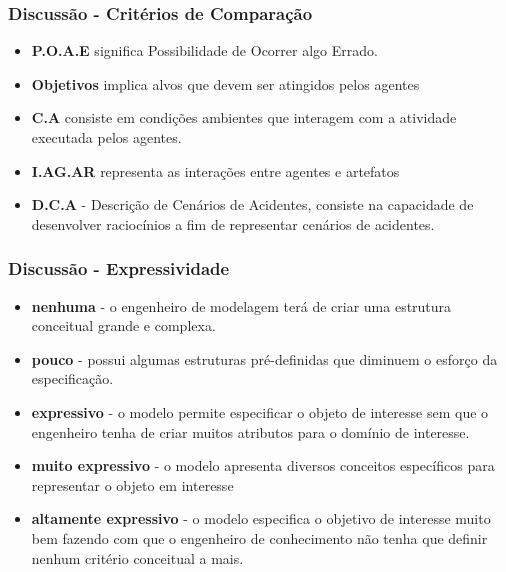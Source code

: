 \documentclass{beamer}
\begin{document}
\begin{frame}
	\frametitle{Discussão - Critérios de Comparação}
	\begin{itemize}
		\item \textbf{P.O.A.E} significa Possibilidade de Ocorrer algo Errado.
		\item \textbf{Objetivos} implica alvos que devem ser atingidos pelos agentes 
		\item \textbf{C.A} consiste em condições ambientes que interagem com a atividade executada pelos agentes.
		\item \textbf{I.AG.AR} representa as interações entre agentes e artefatos
		\item \textbf{D.C.A} - Descrição de Cenários de Acidentes, consiste na capacidade de desenvolver raciocínios a fim de representar cenários de acidentes.
	\end{itemize}
\end{frame}
\begin{frame}
	\frametitle{Discussão - Expressividade}
	\begin{itemize}
			\item \textbf{nenhuma} - o engenheiro de modelagem terá de criar uma estrutura conceitual grande e complexa. 
			\item \textbf{pouco} - possui algumas estruturas pré-definidas que diminuem o esforço da especificação. 
			\item \textbf{expressivo} - o modelo permite especificar o objeto de interesse sem que o engenheiro tenha de criar muitos atributos para o domínio de interesse.
			\item \textbf{muito expressivo} - o modelo apresenta diversos conceitos específicos para representar o objeto em interesse
			\item \textbf{altamente expressivo} - o modelo especifica o objetivo de interesse muito bem fazendo com que o engenheiro de conhecimento não tenha que definir nenhum critério conceitual a mais.
	\end{itemize}
\end{frame}
\end{document}
